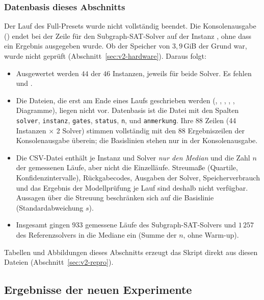 \documentclass[a4paper,12pt]{article}
\theoremstyle{definition}
\begin{document}
\subsubsection{Datenbasis dieses Abschnitts}
\label{sec:v2-daten}

Der Lauf des Full-Presets wurde nicht vollständig beendet. Die Konsolenausgabe () endet bei der Zeile für den Subgraph-SAT-Solver auf der Instanz , ohne dass ein Ergebnis ausgegeben wurde. Ob der Speicher von $3{,}9$\,GiB der Grund war, wurde nicht geprüft (Abschnitt~\ref{sec:v2-hardware}). Daraus folgt:

\begin{itemize}
	\item Ausgewertet werden $44$ der $46$ Instanzen, jeweils für beide Solver. Es fehlen  und .
	\item Die Dateien, die erst am Ende eines Laufs geschrieben werden (, , , , , Diagramme), liegen nicht vor. Datenbasis ist die Datei  mit den Spalten \texttt{solver}, \texttt{instanz}, \texttt{gates}, \texttt{status}, \texttt{n},  und \texttt{anmerkung}. Ihre $88$ Zeilen (44 Instanzen $\times$ 2 Solver) stimmen vollständig mit den $88$ Ergebniszeilen der Konsolenausgabe überein; die Basislinien stehen nur in der Konsolenausgabe.
	\item Die CSV-Datei enthält je Instanz und Solver \emph{nur den Median} und die Zahl $n$ der gemessenen Läufe, aber nicht die Einzelläufe. Streumaße (Quartile, Konfidenzintervalle), Rückgabecodes, Ausgaben der Solver, Speicherverbrauch und das Ergebnis der Modellprüfung je Lauf sind deshalb nicht verfügbar. Aussagen über die Streuung beschränken sich auf die Basislinie (Standardabweichung $s$).
	\item Insgesamt gingen $933$ gemessene Läufe des Subgraph-SAT-Solvers und $1\,257$ des Referenzsolvers in die Mediane ein (Summe der $n$, ohne Warm-up).
\end{itemize}

Tabellen und Abbildungen dieses Abschnitts erzeugt das Skript  direkt aus diesen Dateien (Abschnitt~\ref{sec:v2-repro}).

\subsection{Ergebnisse der neuen Experimente}
\label{sec:v2-ergebnisse}
\end{document}

